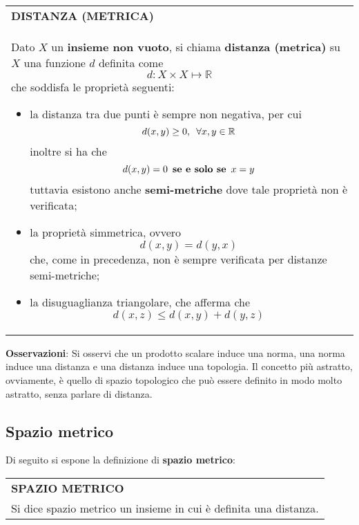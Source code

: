 \documentclass[a4paper]{extarticle}
\renewcommand\arraystretch{}
\begin{document}
\vspace{1em}
\setlength{\tabcolsep}{14pt}
\renewcommand{\arraystretch}{2}
\noindent
\begin{tabularx}{\textwidth}{@{}|P|@{}}
    \hline
    {\textbf{DISTANZA (METRICA)}}\\
    \parbox{\linewidth}{Dato $X$ un \textbf{insieme non vuoto}, si chiama \textbf{distanza (metrica)} su $X$ una funzione $d$ definita come
    \[d : X \times X \longmapsto \mathbb{R}\]
    che soddisfa le proprietà seguenti:
    \begin{itemize}
        \item la distanza tra due punti è sempre non negativa, per cui
        \[d(x,y) \geq 0, \hspace{0.5em} \forall x, y \in \mathbb{R}\]
        inoltre si ha che
        \[d(x,y) = 0 \hspace{0.5em} \textbf{se e solo se} \hspace{0.5em} x=y\]
        tuttavia esistono anche \textbf{semi-metriche} dove tale proprietà non è verificata;

        \item la proprietà simmetrica, ovvero
        \[d(x,y)=d(y,x)\]
        che, come in precedenza, non è sempre verificata per distanze semi-metriche;

        \item la disuguaglianza triangolare, che afferma che 
        \[d(x,z) \leq d(x,y) + d(y,z)\]
    \end{itemize}
    \vspace{-1mm}}\\
    \hline
\end{tabularx}

\vspace{2em}
\noindent
\textbf{Osservazioni}: Si osservi che un prodotto scalare induce una norma, una norma induce una distanza e una distanza induce una topologia. Il concetto più astratto, ovviamente, è quello di spazio topologico che può essere definito in modo molto astratto, senza parlare di distanza.

\vspace{1em}
\noindent
\subsection{Spazio metrico}
Di seguito si espone la definizione di \textbf{spazio metrico}:

\vspace{1em}
\setlength{\tabcolsep}{14pt}
\renewcommand{\arraystretch}{2}
\noindent
\begin{tabularx}{\textwidth}{@{}|P|@{}}
    \hline
    {\textbf{SPAZIO METRICO}}\\
    \parbox{\linewidth}{Si dice spazio metrico un insieme in cui è definita una distanza. \vspace{3mm}}\\
    \hline
\end{tabularx}
\end{document}
